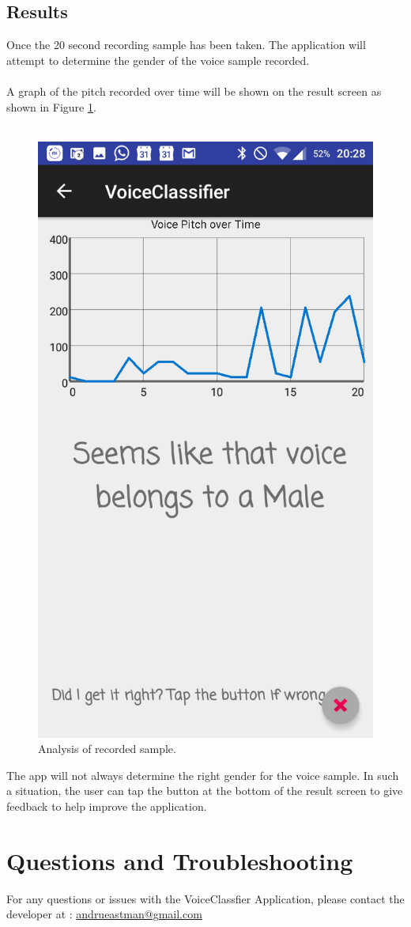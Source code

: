 \documentclass[letterpaper, 12 pt]{report}
\begin{document}
\subsection{Results}
Once the 20 second recording sample has been taken. The application will attempt to determine the gender of the voice sample recorded. \\ \\A graph of the pitch recorded over time will be shown on the result screen as shown in Figure \ref{fig:result}.\\ \\
\begin{figure}[H]
\centering
  \includegraphics[width=0.45\linewidth]{Photos/Result.png}
  \caption{Analysis of recorded sample.}
\label{fig:result}
\end{figure}
The app will not always determine the right gender for the voice sample. In such a situation, the user can tap the button at the bottom of the result screen to give feedback to help improve the application.
\newpage

\section{Questions and Troubleshooting}
For any questions or issues with the VoiceClassfier Application, please contact the developer at : \href{mailto:andrueastman@gmail.com}{andrueastman@gmail.com} 

\end{document}
